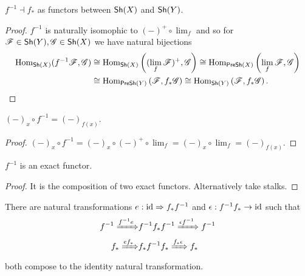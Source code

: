 \documentclass{memoir}
\begin{document}
\begin{corollary}
    $f^{-1}\dashv f_*$ as functors between ${\normalfont\mathsf{Sh}}(X)$ and ${\normalfont\mathsf{Sh}}(Y)$.
\end{corollary}
\begin{proof}
    $f^{-1}$ is naturally isomophic to $(-)^+\circ \lim_f$ and so for $\mathscr{F}\in{\normalfont\mathsf{Sh}}(Y),\mathscr{G}\in{\normalfont\mathsf{Sh}}(X)$ we have natural bijections
    \begin{align}
        \operatorname{Hom}_{{\normalfont\mathsf{Sh}}(X)}(f^{-1}\mathscr{F},\mathscr{G}) &\cong \operatorname{Hom}_{{\normalfont\mathsf{Sh}}(X)}\left((\lim_f\mathscr{F})^+,\mathscr{G}\right) \cong \operatorname{Hom}_{{\normalfont\mathsf{PreSh}}(X)}\left(\lim_f\mathscr{F},\mathscr{G}\right) \nonumber \\
                                             &\cong \operatorname{Hom}_{{\normalfont\mathsf{PreSh}}(Y)}\left(\mathscr{F},f_*\mathscr{G}\right) \cong \operatorname{Hom}_{{\normalfont\mathsf{Sh}}(Y)}\left(\mathscr{F},f_*\mathscr{G}\right).
    \end{align}
\end{proof}
\begin{corollary}
    $(-)_x\circ f^{-1} = (-)_{f(x)}$.
\end{corollary}
\begin{proof}
    $(-)_x\circ f^{-1} = (-)_x \circ (-)^+ \circ \lim_f = (-)_x \circ \lim_f = (-)_{f(x)}$.
\end{proof}
\begin{corollary}
    $f^{-1}$ is an exact functor.
\end{corollary}
\begin{proof}
    It is the composition of two exact functors.
    Alternatively take stalks.
\end{proof}
\begin{corollary}
    There are natural transformations $e:\operatorname{id}\Rightarrow f_*f^{-1}$ and $\epsilon: f^{-1}f_*\to \operatorname{id}$ such that 
    \begin{align}
        f^{-1}\xRightarrow{f^{-1}e} &f^{-1}f_*f^{-1} \xRightarrow{\epsilon f^{-1}} f^{-1} \\
        f_*\xRightarrow{ef_*} &f_*f^{-1}f_* \xRightarrow{f_*\epsilon} f_*
    \end{align}
    both compose to the identity natural transformation.
\end{corollary}
\end{document}

